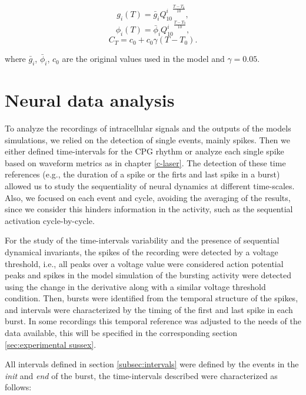 \begin{equation}g_i(T)=\bar{g}_i{Q^i_{10}}^{\frac{T-T_0}{10}},
\label{Q10_conductance}
\end{equation}
\begin{equation}\phi_i(T)=\bar{\phi}_i{Q^i_{10}}^{\frac{T-T_0}{10}},
\label{Q10_gates}\end{equation}
\begin{equation}C_T=c_0 + c_0 \gamma(T-T_0).\end{equation}


where $\bar{g}_i$, $\bar{\phi}_i$, $c_0$ are the original values used in the model and $\gamma = 0.05$.

 
\section{Neural data analysis}

To analyze the recordings of intracellular signals and the outputs of the models simulations, we relied on the detection of single events, mainly spikes. Then we either defined time-intervals for the CPG rhythm or analyze each single spike based on waveform metrics as in chapter \ref{c-laser}. The detection of these time references (e.g., the duration of a spike or the firts and last spike in a burst) allowed us to study the sequentiality of neural dynamics at different time-scales. Also, we focused on each event and cycle, avoiding the averaging of the results, since we consider this hinders information in the activity, such as the sequential activation cycle-by-cycle. 

For the study of the time-intervals variability and the presence of sequential dynamical invariants, the spikes of the recording were detected by a voltage threshold, i.e., all peaks over a voltage value were considered action potential peaks and spikes in the model simulation of the bursting activity were detected using the change in the derivative along with a similar voltage threshold condition. Then, bursts were identified from the temporal structure of the spikes, and intervals were characterized by the timing of the first and last spike in each burst. In some recordings this temporal reference was adjusted to the needs of the data available, this will be specified in the corresponding section \ref{sec:experimental sussex}.

All intervals defined in section \ref{subsec:intervals} were defined by the events in the \textit{init} and \textit{end} of the burst, the time-intervals described were characterized as follows:

